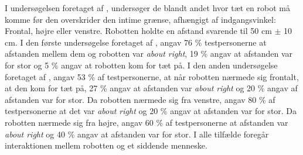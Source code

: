 I undersøgelsen foretaget af \textcite{PDF:HowMayIServeYou}, undersøger de blandt andet hvor tæt en robot må komme før den overskrider den intime grænse, afhængigt af indgangsvinkel: Frontal, højre eller venstre. Robotten holdte en afstand svarende til 50 cm $\pm$ 10 cm. I den første undersøgelse foretaget af \textcite[s. 174]{PDF:HowMayIServeYou}, angav 76 \% testpersonerne at afstanden mellem dem og robotten var \textit{about right}, 19 \% angav at afstanden var for stor og 5 \% angav at robotten kom for tæt på. I den anden undersøgelse foretaget af \textcite[s. 175]{PDF:HowMayIServeYou}, angav 53 \% af testpersonerne, at når robotten nærmede sig frontalt, at den kom for tæt på, 27 \% angav at afstanden var \textit{about right} og 20 \% angav af afstanden var for stor. Da robotten nærmede sig fra venstre, angav 80 \% af testpersonerne at det var \textit{about right} og 20 \% angav at afstanden var for stor. Da robotten nærmede sig fra højre, angav 60 \% af testpersonerne at afstanden var \textit{about right} og 40 \% angav at afstanden var for stor. I alle tilfælde foregår interaktionen mellem robotten og et siddende menneske.

